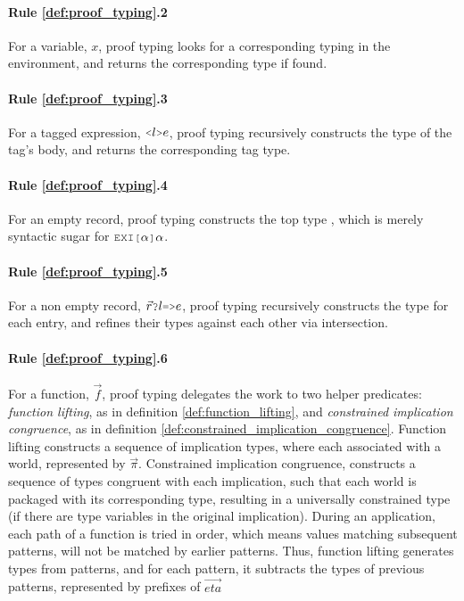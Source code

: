 \documentclass[acmsmall]{acmart}
\theoremstyle{definition}
\begin{document}
\paragraph{Rule \ref{def:proof_typing}.2}
For a variable, $x$, proof typing looks
for a corresponding typing in the environment, and returns the 
corresponding type if found.

\paragraph{Rule \ref{def:proof_typing}.3}
For a tagged expression, $\J{<}l\J{>}e$, proof typing recursively 
constructs the type of the tag's body,
and returns the corresponding tag type.

\paragraph{Rule \ref{def:proof_typing}.4}
For an empty record, proof typing constructs the top type ,
which is merely syntactic sugar for $\J{EXI[}\alpha\J{]}\alpha$.

\paragraph{Rule \ref{def:proof_typing}.5}
For a non empty record, $\vec{r}\J{?}l\J{=>}e$, proof typing 
recursively constructs the type for each entry, and
refines their types against each other via intersection.

\paragraph{Rule \ref{def:proof_typing}.6}
For a function, $\vec{f}$, proof typing 
delegates the work to two helper predicates: \emph{function lifting}, as in definition \ref{def:function_lifting}, and
\emph{constrained implication congruence}, as in definition \ref{def:constrained_implication_congruence}.
Function lifting constructs a sequence of implication types, where each associated with a world, represented by $\vec{\pi}$.
Constrained implication congruence, constructs a sequence of types congruent with each implication,
such that each world is packaged with its corresponding type, resulting in a universally constrained type 
(if there are type variables in the original implication). 
During an application, each path of a function is tried in order, which means values matching subsequent
patterns, will not be matched by earlier patterns. Thus, function lifting generates types from patterns,
and for each pattern, it subtracts the types of previous patterns,
represented by prefixes of $\vec{eta}$
\end{document}
